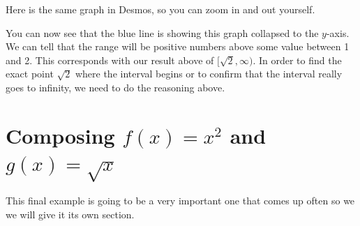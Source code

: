 \documentclass{ximera}
\begin{document}
\begin{example}
\begin{explanation}
Here is the same graph in Desmos, so you can zoom in and out yourself.
\begin{center}  
\end{center}

You can now see that the blue line is showing this graph collapsed to the $y$-axis.  We can tell that the range will be positive numbers above some value between 1 and 2.  This corresponds with our result above of $[\sqrt{2},\infty)$.  In order to find the exact point $\sqrt{2}$ where the interval begins or to confirm that the interval really goes to infinity, we need to do the reasoning above.

\end{explanation}

\end{example}


\section{Composing $f(x)=x^2$ and $g(x)=\sqrt{x}$}

This final example is going to be a very important one that comes up often so we we will give it its own section.
\end{document}
